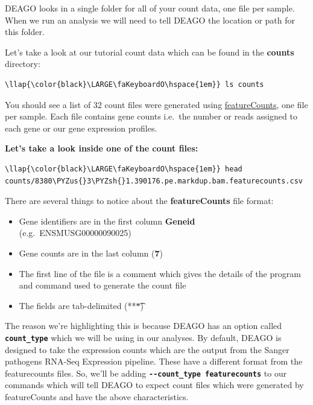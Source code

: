 \documentclass[11pt]{article}
\def\PYZus{\char`\_}
\def\PYZsh{\char`\#}
\begin{document}
DEAGO looks in a single folder for all of your count data, one file per
sample. When we run an analysis we will need to tell DEAGO the location
or path for this folder.

Let's take a look at our tutorial count data which can be found in the
\textbf{counts} directory:

\begin{terminalinput}
\begin{Verbatim}[commandchars=\\\{\}]
\llap{\color{black}\LARGE\faKeyboardO\hspace{1em}} ls counts
\end{Verbatim}
\end{terminalinput}

    You should see a list of 32 count files were generated using
\href{http://bioinf.wehi.edu.au/featureCounts/}{featureCounts}, one file
per sample. Each file contains gene counts i.e.~the number or reads
assigned to each gene or our gene expression profiles.


\newpage



\textbf{Let's take a look inside one of the count files:}

\begin{terminalinput}
\begin{Verbatim}[commandchars=\\\{\}]
\llap{\color{black}\LARGE\faKeyboardO\hspace{1em}} head counts/8380\PYZus{}3\PYZsh{}1.390176.pe.markdup.bam.featurecounts.csv
\end{Verbatim}
\end{terminalinput}

    There are several things to notice about the \textbf{featureCounts} file
format:

\begin{itemize}
\item
  Gene identifiers are in the first column \textbf{Geneid}
  (e.g.~ENSMUSG00000090025)
\item
  Gene counts are in the last column (\textbf{7})
\item
  The first line of the file is a comment which gives the details of the
  program and command used to generate the count file
\item
  The fields are tab-delimited (**\t**)
\end{itemize}

The reason we're highlighting this is because DEAGO has an option called
\textbf{\texttt{count\_type}} which we will be using in our analyses. By
default, DEAGO is designed to take the expression counts which are the
output from the Sanger pathogens RNA-Seq Expression pipeline. These have
a different format from the featurecounts files. So, we'll be adding
\textbf{\texttt{-\/-count\_type\ featurecounts}} to our commands which
will tell DEAGO to expect count files which were generated by
featureCounts and have the above characteristics.
\end{document}
